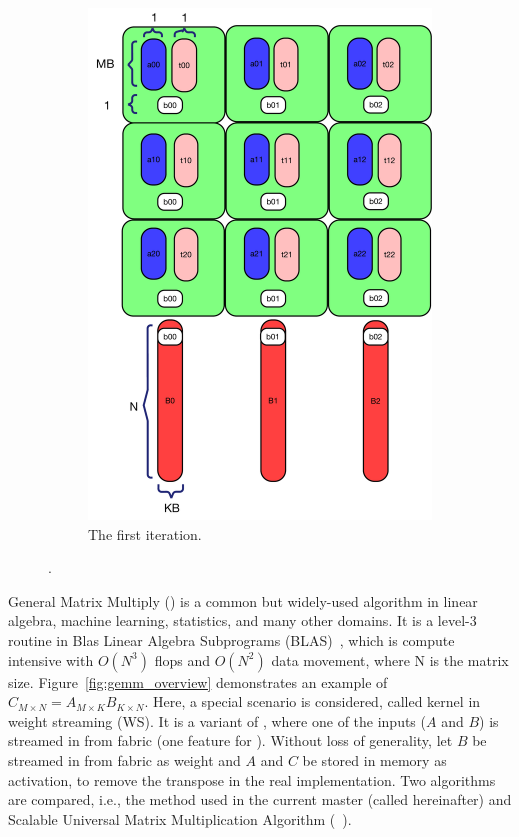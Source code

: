 \begin{figure}[b!]
\begin{subfigure}{0.40\columnwidth}
    \includegraphics[width=\linewidth]{figures/gemm_A_C_memory_master/2.pdf}
    \caption{The first iteration.}
    \label{fig:gemm_master_2}
  \end{subfigure}
  \caption{\master.}
  \label{fig:gemm_master}
\end{figure}

General Matrix Multiply (\gemm) is a common but widely-used algorithm in linear algebra, machine learning, statistics, and many other domains.
%
It is a level-3 routine in Blas Linear Algebra Subprograms (BLAS)~\cite{blas}, which is compute intensive with $O(N^3)$ flops and $O(N^2)$ data movement, where N is the matrix size.
%
Figure~\ref{fig:gemm_overview} demonstrates an example of ${C}_{M \times N} = A_{M \times K} B_{K \times N}$.
%
Here, a special scenario is considered, called \matmul kernel in weight streaming (WS).
%
It is a variant of \gemm, where one of the inputs ($A$ and $B$) is streamed in from fabric (one feature for \wse).
%
Without loss of generality, let $B$ be streamed in from fabric as weight and $A$ and $C$ be stored in memory as activation, to remove the transpose in the real implementation.
%
Two algorithms are compared, i.e., the method used in the current master (called \master hereinafter) and Scalable Universal Matrix Multiplication Algorithm (\summa~\cite{van1997summa}).